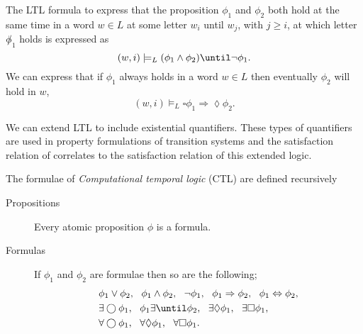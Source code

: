 \begin{ex}
The LTL formula to express that the proposition $\phi_{1}$ and $\phi_{2}$ both hold at the same time in a word $w\in L$ at some letter $w_{i}$ until $w_{j}$, with $j\geq i$, at which letter $\not \phi_{1}$ holds is expressed as
\[
(w,i)\models_{L}(\phi_{1}\land\phi_{2})\until \lnot \phi_{1}.
\]
We can express that if $\phi_{1}$ always holds in a word $w\in L$ then eventually $\phi_{2}$ will hold in $w$,
\[
(w,i)\models_{L}\square\phi_{1}\Rightarrow\lozenge\phi_{2}.
\]
\end{ex}
We can extend LTL to include existential quantifiers. These types of quantifiers are used in property formulations of transition systems and the satisfaction relation of correlates to the satisfaction relation of this extended logic.

\begin{defi}
The formulae of \emph{Computational temporal logic} (CTL) are defined recursively
\begin{description}
    \item[Propositions]{Every atomic proposition $\phi$ is a formula.}
    \item[Formulas]{If $\phi_{1}$ and $\phi_{2}$ are formulae then so are the following;
    \begin{align*}
        & \phi_{1} \lor \phi_{2},\ \ \phi_{1} \land \phi_{2}, \ \ \lnot \phi_{1}, \ \
        \phi_{1} \Rightarrow \phi_{2},\ \ \phi_{1} \Leftrightarrow \phi_{2}, \\
        & \exists\bigcirc \phi_{1}, \ \ \phi_{1} \exists\until \phi_{2}, \ \
        \exists\lozenge \phi_{1}, \ \ \exists\square \phi_{1}, \\
        & \forall\bigcirc \phi_{1}, \ \ \forall\lozenge \phi_{1}, \ \ \forall\square \phi_{1}.
    \end{align*}}
\end{description}
\end{defi}

